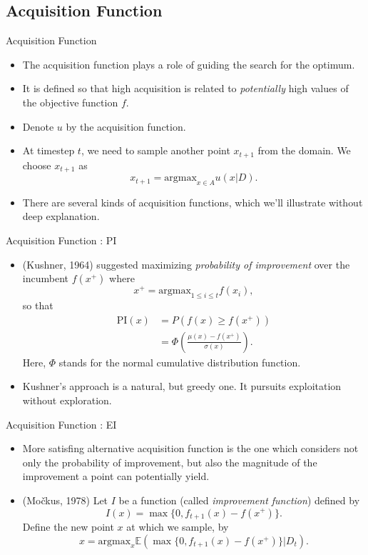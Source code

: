 \documentclass{beamer}
\begin{document}
\subsection{Acquisition Function}
\begin{frame}{Acquisition Function}
\begin{itemize}
\item
The acquisition function plays a role of guiding the search for the optimum.
\item
It is defined so that high acquisition is related to \emph{potentially} high values of the objective function \(f\).
\item
Denote \(u\) by the acquisition function.
\item
At timestep \(t\), we need to sample another point \(x_{t+1}\) from the domain.
We choose \(x_{t+1}\) as
\[x_{t+1}=\text{argmax}_{x\in A}u(x|D).\]
\item
There are several kinds of acquisition functions, which we'll illustrate without deep explanation.
\end{itemize}
\end{frame}

%
\begin{frame}{Acquisition Function : PI}
\begin{itemize}
\item
(Kushner, 1964) suggested maximizing \emph{probability of improvement} over the incumbent \(f(x^+)\) where
\[x^+=\text{argmax}_{1\le i\le t}f(x_i),\]
so that
\begin{align*}
\text{PI}(x)
&=P(f(x)\ge f(x^+))\\
&=\Phi\left(\frac{\mu(x)-f(x^+)}{\sigma(x)}\right).
\end{align*}
Here, \(\Phi\) stands for the normal cumulative distribution function.
\item
Kushner's approach is a natural, but greedy one.
It pursuits exploitation without exploration.
\end{itemize}
\end{frame}

%
\begin{frame}{Acquisition Function : EI}
\begin{itemize}
\item
More satisfing alternative acquisition function is the one which considers not only the probability of improvement, but also the magnitude of the improvement a point can potentially yield.
\item
(Močkus, 1978) Let \(I\) be a function (called \emph{improvement function}) defined by
\[I(x)=\max\{0,f_{t+1}(x)-f(x^+)\}.\]
Define the new point \(x\) at which we sample, by
\[x=\text{argmax}_x\mathbb E\left(\max\{0,f_{t+1}(x)-f(x^+)\}|D_t\right).\]
\end{itemize}
\end{frame}
\end{document}
